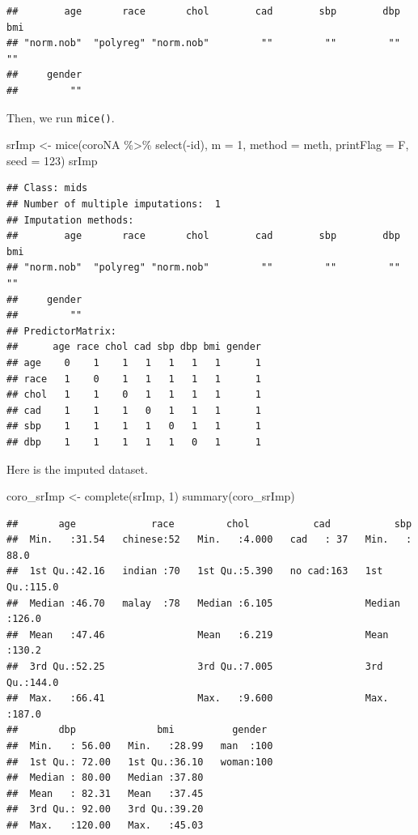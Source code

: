 \documentclass[
  10pt,
]{krantz}
\newenvironment{Shaded}{\begin{snugshade}}{\end{snugshade}}
\newcommand{\AttributeTok}[1]{\textcolor[rgb]{0.77,0.63,0.00}{#1}}
\newcommand{\DecValTok}[1]{\textcolor[rgb]{0.00,0.00,0.81}{#1}}
\newcommand{\FunctionTok}[1]{\textcolor[rgb]{0.00,0.00,0.00}{#1}}
\newcommand{\NormalTok}[1]{#1}
\newcommand{\OtherTok}[1]{\textcolor[rgb]{0.56,0.35,0.01}{#1}}
\newcommand{\SpecialCharTok}[1]{\textcolor[rgb]{0.00,0.00,0.00}{#1}}
\begin{document}
\begin{verbatim}
##        age       race       chol        cad        sbp        dbp        bmi 
## "norm.nob"  "polyreg" "norm.nob"         ""         ""         ""         "" 
##     gender 
##         ""
\end{verbatim}

Then, we run \texttt{mice()}.

\begin{Shaded}
\begin{Highlighting}[]
\NormalTok{srImp }\OtherTok{\textless{}{-}} \FunctionTok{mice}\NormalTok{(coroNA }\SpecialCharTok{\%\textgreater{}\%} \FunctionTok{select}\NormalTok{(}\SpecialCharTok{{-}}\NormalTok{id), }
              \AttributeTok{m =} \DecValTok{1}\NormalTok{, }\AttributeTok{method =}\NormalTok{ meth, }\AttributeTok{printFlag =}\NormalTok{ F, }\AttributeTok{seed =} \DecValTok{123}\NormalTok{)}
\NormalTok{srImp}
\end{Highlighting}
\end{Shaded}

\begin{verbatim}
## Class: mids
## Number of multiple imputations:  1 
## Imputation methods:
##        age       race       chol        cad        sbp        dbp        bmi 
## "norm.nob"  "polyreg" "norm.nob"         ""         ""         ""         "" 
##     gender 
##         "" 
## PredictorMatrix:
##      age race chol cad sbp dbp bmi gender
## age    0    1    1   1   1   1   1      1
## race   1    0    1   1   1   1   1      1
## chol   1    1    0   1   1   1   1      1
## cad    1    1    1   0   1   1   1      1
## sbp    1    1    1   1   0   1   1      1
## dbp    1    1    1   1   1   0   1      1
\end{verbatim}

Here is the imputed dataset.

\begin{Shaded}
\begin{Highlighting}[]
\NormalTok{coro\_srImp }\OtherTok{\textless{}{-}} \FunctionTok{complete}\NormalTok{(srImp, }\DecValTok{1}\NormalTok{)}
\FunctionTok{summary}\NormalTok{(coro\_srImp)}
\end{Highlighting}
\end{Shaded}

\begin{verbatim}
##       age             race         chol           cad           sbp       
##  Min.   :31.54   chinese:52   Min.   :4.000   cad   : 37   Min.   : 88.0  
##  1st Qu.:42.16   indian :70   1st Qu.:5.390   no cad:163   1st Qu.:115.0  
##  Median :46.70   malay  :78   Median :6.105                Median :126.0  
##  Mean   :47.46                Mean   :6.219                Mean   :130.2  
##  3rd Qu.:52.25                3rd Qu.:7.005                3rd Qu.:144.0  
##  Max.   :66.41                Max.   :9.600                Max.   :187.0  
##       dbp              bmi          gender   
##  Min.   : 56.00   Min.   :28.99   man  :100  
##  1st Qu.: 72.00   1st Qu.:36.10   woman:100  
##  Median : 80.00   Median :37.80              
##  Mean   : 82.31   Mean   :37.45              
##  3rd Qu.: 92.00   3rd Qu.:39.20              
##  Max.   :120.00   Max.   :45.03
\end{verbatim}
\end{document}
